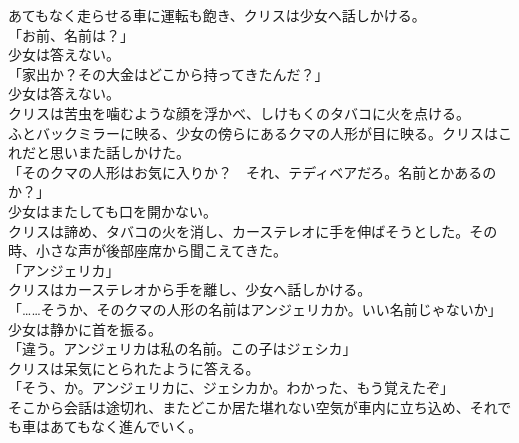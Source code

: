 \documentclass[b5j,10pt,openany]{jsbook}
\begin{document}
あてもなく走らせる車に運転も飽き、クリスは少女へ話しかける。\\「お前、名前は？」\\少女は答えない。\\「家出か？その大金はどこから持ってきたんだ？」\\少女は答えない。\\クリスは苦虫を噛むような顔を浮かべ、しけもくのタバコに火を点ける。\\ふとバックミラーに映る、少女の傍らにあるクマの人形が目に映る。クリスはこれだと思いまた話しかけた。\\「そのクマの人形はお気に入りか？　それ、テディベアだろ。名前とかあるのか？」\\少女はまたしても口を開かない。\\クリスは諦め、タバコの火を消し、カーステレオに手を伸ばそうとした。その時、小さな声が後部座席から聞こえてきた。\\「アンジェリカ」\\クリスはカーステレオから手を離し、少女へ話しかける。\\「\ldots{}\ldots{}そうか、そのクマの人形の名前はアンジェリカか。いい名前じゃないか」\\少女は静かに首を振る。\\「違う。アンジェリカは私の名前。この子はジェシカ」\\クリスは呆気にとられたように答える。\\「そう、か。アンジェリカに、ジェシカか。わかった、もう覚えたぞ」\\そこから会話は途切れ、またどこか居た堪れない空気が車内に立ち込め、それでも車はあてもなく進んでいく。
\end{document}
